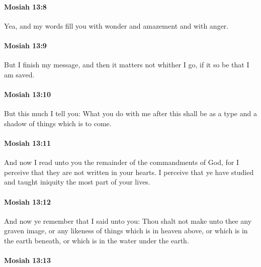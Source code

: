 		\paragraph{Mosiah 13:8} %
			\label{MOSIAH-13-8}

			Yea, and my words fill you with wonder and amazement and with anger.

		\paragraph{Mosiah 13:9} %
			\label{MOSIAH-13-9}

			But I finish my message,
			and then it matters not whither I go,
			if it so be that I am saved.

		\paragraph{Mosiah 13:10} %
			\label{MOSIAH-13-10}

			But this much I tell you:
			What you do with me after this
			shall be as a type and a shadow of things which is to come.

		\paragraph{Mosiah 13:11} %
			\label{MOSIAH-13-11}

			And now I read unto you the remainder of the commandments of God,
			for I perceive that they are not written in your hearts.
			I perceive that ye have studied and taught iniquity the most part of your lives.

		\paragraph{Mosiah 13:12} %
			\label{MOSIAH-13-12}

			And now ye remember that I said unto you:
			Thou shalt not make unto thee any graven image,
			or any likeness of things which is in heaven above,
			or which is in the earth beneath,
			or which is in the water under the earth.

		\paragraph{Mosiah 13:13} %
			\label{MOSIAH-13-13}

